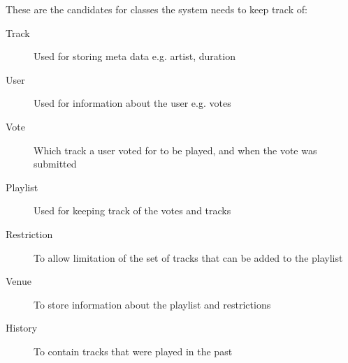 These are the candidates for classes the system needs to keep track of:
\begin{description}
    \item[Track]

    Used for storing meta data e.g. artist, duration
    \item[User]

    Used for information about the user e.g. votes
    \item[Vote]

    Which track a user voted for to be played, and when the vote was submitted
    \item[Playlist]

    Used for keeping track of the votes and tracks
    \item[Restriction]

    To allow limitation of the set of tracks that can be added to the playlist
    \item[Venue]

    To store information about the playlist and restrictions
    \item[History]
    To contain tracks that were played in the past
\end{description}
